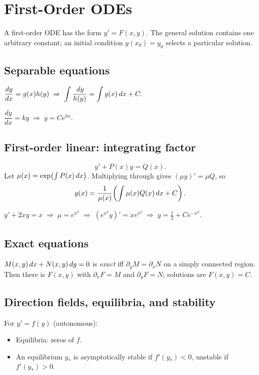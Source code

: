 \section{First-Order ODEs}

A first-order ODE has the form $y' = F(x, y)$. The general solution contains one arbitrary
constant; an initial condition $y(x_0) = y_0$ selects a particular solution.

\subsection{Separable equations}
$\dfrac{dy}{dx} = g(x) h(y) \;\Rightarrow\; \displaystyle\int \frac{\,dy}{h(y)} = \int g(x) \,dx + C.$

\begin{example}
$\dfrac{dy}{dx} = ky \;\Rightarrow\; y = C e^{kx}$.
\end{example}

\subsection{First-order linear: integrating factor}
\[ y' + P(x) y = Q(x). \]
Let $\mu(x) = \exp\!\left(\int P(x) \,dx\right)$. Multiplying through gives $(\mu y)' = \mu Q$, so
\[ y(x) = \frac{1}{\mu(x)} \!\left( \int \mu(x) Q(x) \,dx + C \right). \]

\begin{example}
$y' + 2x y = x \;\Rightarrow\; \mu = e^{x^2} \;\Rightarrow\; (e^{x^2} y)' = x e^{x^2}
\;\Rightarrow\; y = \tfrac{1}{2} + C e^{-x^2}.$
\end{example}

\subsection{Exact equations}
$M(x,y) \,dx + N(x,y) \,dy = 0$ is \emph{exact} iff $\partial_y M = \partial_x N$ on a simply
connected region. Then there is $F(x,y)$ with $\partial_x F = M$ and $\partial_y F = N$;
solutions are $F(x,y) = C$.

\subsection{Direction fields, equilibria, and stability}
For $y' = f(y)$ (autonomous):
\begin{itemize}[leftmargin=*,nosep]
  \item Equilibria: zeros of $f$.
  \item An equilibrium $y_*$ is asymptotically stable if $f'(y_*) < 0$, unstable if $f'(y_*) > 0$.
\end{itemize}

